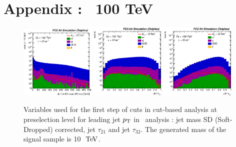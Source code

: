 \clearpage
\newpage

\section{Appendix :  \texorpdfstring{\Zptt}{zptt}\ 100 TeV}
\label{appendix:zptt100}


\begin{figure}[!htb]\centering
\includegraphics[width=0.32\textwidth]{Fig/Zptt/Jet1_trk02_SD_Cor_m_sel0_nostack_log.eps}
\includegraphics[width=0.32\textwidth]{Fig/Zptt/Jet1_tau21_sel0_nostack_log.eps}
\includegraphics[width=0.32\textwidth]{Fig/Zptt/Jet1_tau32_sel0_nostack_log.eps}
\caption{Variables used for the first step of cuts in cut-based analysis at preselection level for leading jet $p\sb{\scriptstyle\mathrm{T}}$ in \Zptt\ analysis : jet mass SD (Soft-Dropped) corrected, jet $\tau_{21}$ and jet $\tau_{32}$. The generated mass of the signal sample is 10 $\TeV$.}
\label{fig:Zptt_sel0_cut}
\end{figure}

